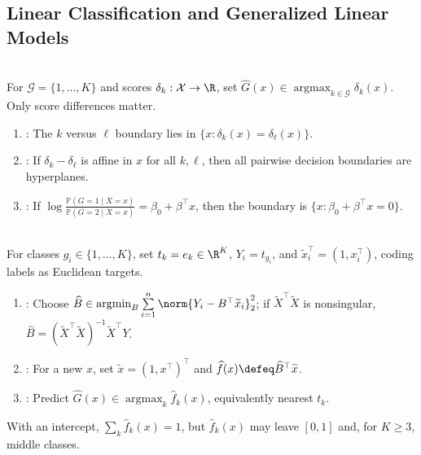 \subsection{Linear Classification and Generalized Linear Models}
\begin{definition} \label{def:sl-discriminant-functions-linear-boundaries} \\
For $\mathcal{G}=\{1,\ldots,K\}$ and scores $\delta_k:\mathcal{X}\to\R$, set $\widehat{G}(x)\in\operatorname*{argmax}_{k\in\mathcal{G}}\delta_k(x)$.  Only score differences matter.
\begin{enumerate}[label=(\roman*)]
\setlength{\itemsep}{0pt}
\item {}: The $k$ versus $\ell$ boundary lies in $\{x:\delta_k(x)=\delta_\ell(x)\}$.
\item {}: If $\delta_k-\delta_\ell$ is affine in $x$ for all $k,\ell$, then all pairwise decision boundaries are hyperplanes.
\item {}: If $\log\frac{\mathbb{P}(G=1\mid X=x)}{\mathbb{P}(G=2\mid X=x)}=\beta_0+\beta^\top x$, then the boundary is $\{x:\beta_0+\beta^\top x=0\}$.
\end{enumerate}
\end{definition}

\begin{method} \label{meth:sl-indicator-matrix-regression-classifier} \\
For classes $g_i\in\{1,\ldots,K\}$, set $t_k=e_k\in\R^K$, $Y_i=t_{g_i}$, and $\widetilde{x}_i^\top=(1,x_i^\top)$, coding labels as Euclidean targets.
\begin{enumerate}[label=(\roman*)]
\setlength{\itemsep}{0pt}
\item {}: Choose $\widehat{B}\in\operatorname*{argmin}_B\sum\limits_{i=1}^{n}\norm{Y_i-B^\top\widetilde{x}_i}_2^2$; if $\widetilde{X}^\top\widetilde{X}$ is nonsingular, $\widehat{B}=(\widetilde{X}^\top\widetilde{X})^{-1}\widetilde{X}^\top Y$.
\item {}: For a new $x$, set $\widetilde{x}=(1,x^\top)^\top$ and $\widehat{f}(x)\defeq\widehat{B}^\top\widetilde{x}$.
\item {}: Predict $\widehat{G}(x)\in\operatorname*{argmax}_k\widehat{f}_k(x)$, equivalently nearest $t_k$.
\end{enumerate}
With an intercept, $\sum_k\widehat{f}_k(x)=1$, but $\widehat{f}_k(x)$ may leave $[0,1]$ and, for $K\geq3$,  middle classes.
\end{method}

